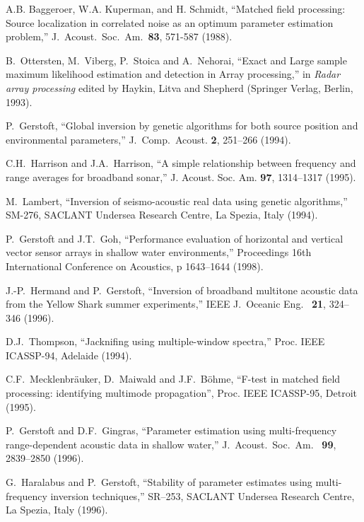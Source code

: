 \documentclass{saclantc}
\begin{document}
\begin{thebibliography}{11}
  A.B. Baggeroer, W.A. Kuperman, and H.
Schmidt, ``Matched field processing: Source localization in
correlated noise as an optimum parameter estimation problem,''
J.\ Acoust.\ Soc.\ Am.\ {\bf 83}, 571-587 (1988).

B.\ Ottersten, M.\ Viberg, P.\ Stoica and A.\ Nehorai, ``Exact and
Large sample maximum likelihood estimation and detection in Array
processing,'' in {\it Radar array processing} 
edited by Haykin, Litva and Shepherd  (Springer Verlag, Berlin, 1993).


P.~Gerstoft,  ``Global inversion by genetic algorithms for both source
position and environmental parameters,'' {J.\ Comp.\ Acoust.} 
  {\bf 2}, 251--266 (1994).

C.H.\ Harrison and J.A.\ Harrison, ``A simple relationship between
frequency and range averages for broadband sonar,'' 
{J. Acoust. Soc. Am.} {\bf 97}, 1314--1317 (1995).

 M.\ Lambert, 
``Inversion of seismo-acoustic real data using genetic algorithms,'' 
SM-276, SACLANT Undersea Research Centre, La Spezia, Italy (1994).

 P.\ Gerstoft and J.T.\ Goh, ``Performance evaluation of horizontal and vertical
vector sensor arrays in shallow water environments,'' Proceedings 16th International Conference on Acoustics,  p 1643--1644 (1998).

 J.-P.~Hermand and P.~Gerstoft, ``Inversion of broadband multitone
acoustic data from the Yellow Shark summer experiments,''
{IEEE J.\ Oceanic Eng.\ } {\bf 21}, 324--346 (1996).

D.J.\ Thompson, ``Jacknifing using multiple-window spectra,''
Proc. IEEE ICASSP-94, Adelaide (1994).

C.F.\ Mecklenbr\"auker, D.\ Maiwald and  J.F.\ B\"ohme,
    ``F-test in matched field processing: 
       identifying multimode propagation'', Proc. IEEE ICASSP-95,
       Detroit (1995).

P.~Gerstoft and D.F.~Gingras, ``Parameter estimation using
 multi-frequency range-dependent acoustic data in shallow water,'' {
 J.~Acoust.~Soc.~Am.\ } {\bf 99}, 2839--2850 (1996).

 G.~Haralabus and P.~Gerstoft, ``Stability of
parameter estimates using multi-frequency inversion techniques,'' 
{SR--253, SACLANT Undersea Research Centre, La Spezia, Italy} (1996).


\end{thebibliography}
\end{document}
